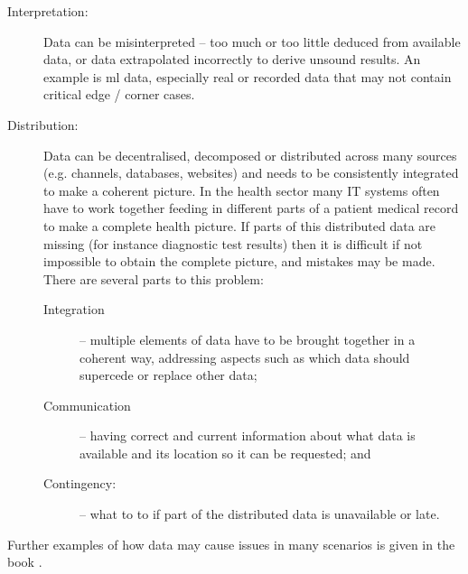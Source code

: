 \begin{description}
	\item[Interpretation:] Data can be misinterpreted -- too much or too little deduced from available data, or data extrapolated incorrectly to derive unsound results.
	An example is \gls{ml} data, especially real or recorded data that may not contain critical edge / corner cases.
	
	\item[Distribution:] Data can be decentralised, decomposed or distributed across many sources (e.g. channels, \glspl{database}, websites) and needs to be consistently integrated to make a coherent picture. In the health sector many IT systems often have to work together feeding in different parts of a patient medical record to make a complete health picture. If parts of this distributed data are missing (for instance diagnostic test results) then it is difficult if not impossible to obtain the complete picture, and mistakes may be made.
	There are several parts to this problem:
	\begin{description}
		\item[Integration] -- multiple elements of data have to be brought together in a coherent way, addressing aspects such as which data should supercede or replace other data;
		\item[Communication] -- having correct and current \gls{information} about what data is available and its location so it can be requested; and
		\item[Contingency:] -- what to to if part of the distributed data is unavailable or late.
	\end{description}
\end{description}


Further examples of how data may cause issues in many scenarios is given in the book  \cite{citation:datacentric}.
